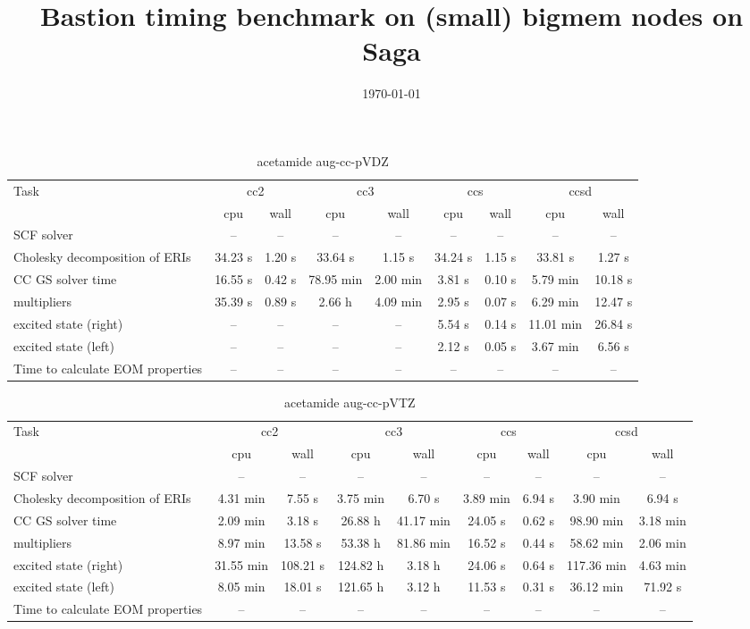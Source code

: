 \documentclass{article}
\title{Bastion timing benchmark on (small) bigmem nodes on Saga}
\date{\today}
\begin{document}
\maketitle
\begin{table}
\caption{acetamide aug-cc-pVDZ}
\begin{tabular}{lcccccccc}
\toprule
Task & \multicolumn{2}{c}{cc2} & \multicolumn{2}{c}{cc3} & \multicolumn{2}{c}{ccs} & \multicolumn{2}{c}{ccsd}\\
\cmidrule(lr){2-3}\cmidrule(lr){4-5}\cmidrule(lr){6-7}\cmidrule(lr){8-9}
 & cpu & wall & cpu & wall & cpu & wall & cpu & wall\\
\midrule
SCF solver & -- & -- & -- & -- & -- & -- & -- & --\\
Cholesky decomposition of ERIs & 34.23 s & 1.20 s & 33.64 s & 1.15 s & 34.24 s & 1.15 s & 33.81 s & 1.27 s\\
CC GS solver time & 16.55 s & 0.42 s & 78.95 min & 2.00 min & 3.81 s & 0.10 s & 5.79 min & 10.18 s\\
multipliers & 35.39 s & 0.89 s & 2.66 h & 4.09 min & 2.95 s & 0.07 s & 6.29 min & 12.47 s\\
excited state (right) & -- & -- & -- & -- & 5.54 s & 0.14 s & 11.01 min & 26.84 s\\
excited state (left) & -- & -- & -- & -- & 2.12 s & 0.05 s & 3.67 min & 6.56 s\\
Time to calculate EOM properties & -- & -- & -- & -- & -- & -- & -- & --\\
\bottomrule
\end{tabular}
\end{table}
\begin{table}
\caption{acetamide aug-cc-pVTZ}
\begin{tabular}{lcccccccc}
\toprule
Task & \multicolumn{2}{c}{cc2} & \multicolumn{2}{c}{cc3} & \multicolumn{2}{c}{ccs} & \multicolumn{2}{c}{ccsd}\\
\cmidrule(lr){2-3}\cmidrule(lr){4-5}\cmidrule(lr){6-7}\cmidrule(lr){8-9}
 & cpu & wall & cpu & wall & cpu & wall & cpu & wall\\
\midrule
SCF solver & -- & -- & -- & -- & -- & -- & -- & --\\
Cholesky decomposition of ERIs & 4.31 min & 7.55 s & 3.75 min & 6.70 s & 3.89 min & 6.94 s & 3.90 min & 6.94 s\\
CC GS solver time & 2.09 min & 3.18 s & 26.88 h & 41.17 min & 24.05 s & 0.62 s & 98.90 min & 3.18 min\\
multipliers & 8.97 min & 13.58 s & 53.38 h & 81.86 min & 16.52 s & 0.44 s & 58.62 min & 2.06 min\\
excited state (right) & 31.55 min & 108.21 s & 124.82 h & 3.18 h & 24.06 s & 0.64 s & 117.36 min & 4.63 min\\
excited state (left) & 8.05 min & 18.01 s & 121.65 h & 3.12 h & 11.53 s & 0.31 s & 36.12 min & 71.92 s\\
Time to calculate EOM properties & -- & -- & -- & -- & -- & -- & -- & --\\
\bottomrule
\end{tabular}
\end{table}
\end{document}
